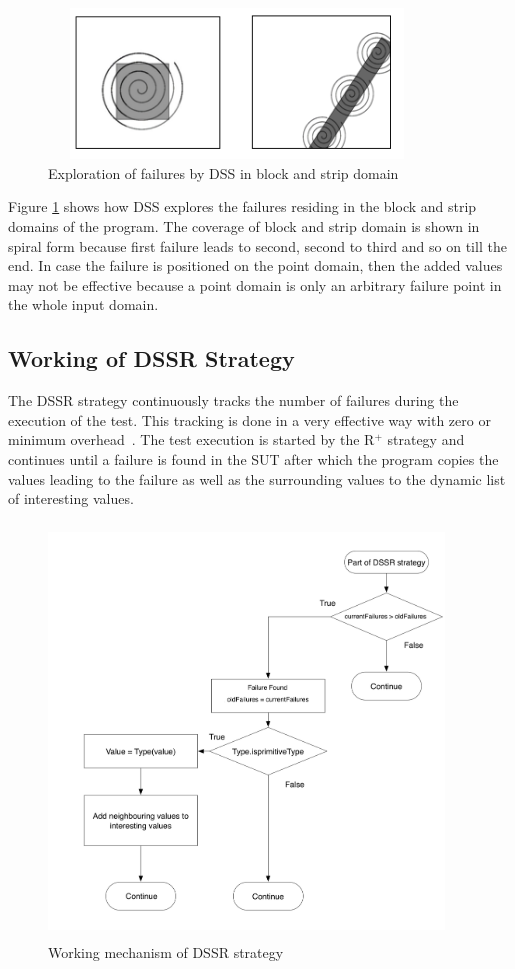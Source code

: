 \bigskip
\bigskip
\begin{figure}[ht]
\centering
\includegraphics[width=10cm,height=4cm]{chapter4/block2.png}
\bigskip
\caption{Exploration of failures by DSS in block and strip domain}
\label{fig:block2}
\end{figure}
\bigskip
\bigskip

Figure \ref{fig:block2} shows how DSS explores the failures residing in the block and strip domains of the program. The coverage of block and strip domain is shown in spiral form because first failure leads to second, second to third and so on till the end. In case the failure is positioned on the point domain, then the added values may not be effective because a point domain is only an arbitrary failure point in the whole input domain.

\subsection{Working of DSSR Strategy}

The DSSR strategy continuously tracks the number of failures during the execution of the test. This tracking is done in a very effective way with zero or minimum overhead~\cite{leitner2009effectiveness}. The test execution is started by the R$^+$ strategy and continues until a failure is found in the SUT after which the program copies the values leading to the failure as well as the surrounding values to the dynamic list of interesting values. 

\begin{figure}[h]
\centering
\includegraphics[width=10.5cm, height=11cm]{chapter4/flowchart1.png}
\bigskip
\caption{Working mechanism of DSSR strategy}
\label{fig:Working_DSSS}
\end{figure}
\bigskip

